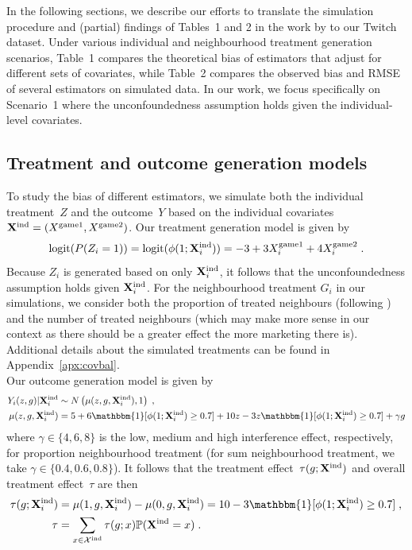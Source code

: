 \documentclass[10pt]{article}
\begin{document}
In the following sections, we describe our efforts to translate the simulation procedure and (partial) findings of Tables~1 and 2 in the work by \textcite{Forastiere:2021} to our Twitch dataset. Under various individual and neighbourhood treatment generation scenarios, Table~1 compares the theoretical bias of estimators that adjust for different sets of covariates, while Table~2 compares the observed bias and RMSE of several estimators on simulated data. In our work, we focus specifically on Scenario~1 where the unconfoundedness assumption holds given the individual-level covariates.

\subsection{Treatment and outcome generation models} \label{sec:models}

To study the bias of different estimators, we simulate both the individual treatment~$Z$ and the outcome~$Y$ based on the individual covariates $\mathbf{X}^{\text{ind}}=(X^\text{game1},X^\text{game2})$. Our treatment generation model is given by
\[
\text{logit}(P(Z_i=1)) = \text{logit}(\phi(1;\mathbf{X}^{\text{ind}}_i)) = -3 + 3X_i^\text{game1} + 4X_i^\text{game2} \;.
\]
Because $Z_i$ is generated based on only $\mathbf{X}^{\text{ind}}_i$, it follows that the unconfoundedness assumption holds given $\mathbf{X}^{\text{ind}}_i$. For the neighbourhood treatment $G_i$ in our simulations, we consider both the proportion of treated neighbours (following \textcite{Forastiere:2021}) and the number of treated neighbours (which may make more sense in our context as there should be a greater effect the more marketing there is). Additional details about the simulated treatments can be found in Appendix~\ref{apx:covbal}.
\\

Our outcome generation model is given by
\begin{align*}
Y_i(z,g)|\Xind_i &\sim N\left(\mu(z,g,\Xind_i),1\right) \;, \\
\mu(z,g,\Xind_i) &= 5 + 6\mathbbm{1}[\phi(1;\Xind_i)\geq 0.7] + 10z - 3z\mathbbm{1}[\phi(1;\Xind_i)\geq0.7] + \gamma g
\end{align*}
where $\gamma\in\{4,6,8\}$ is the low, medium and high interference effect, respectively, for proportion neighbourhood treatment (for sum neighbourhood treatment, we take $\gamma\in\{0.4,0.6,0.8\}$). It follows that the treatment effect~$\tau(g;
\mathbf{X}^{\text{ind}})$ and overall treatment effect~$\tau$ are then
\begin{align*}
\tau(g;\Xind_i) &= \mu(1,g,\Xind_i) - \mu(0,g,\Xind_i) = 10 - 3\mathbbm{1}[\phi(1;\Xind_i)\geq0.7] \;, \\
\tau &= \sum_{x\in\calX^\text{ind}}\tau(g;x)\P(\Xind=x) \;.
\end{align*}
\end{document}
